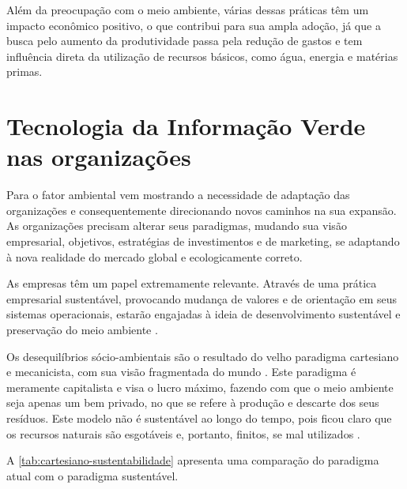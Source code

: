 Além da preocupação com o meio ambiente, várias dessas práticas têm um impacto econômico positivo, o que contribui para sua ampla adoção, já que a busca pelo aumento da produtividade passa pela redução de gastos e tem influência direta da utilização de recursos básicos, como água, energia e matérias primas.

\section{Tecnologia da Informação Verde nas organizações}

Para  o fator ambiental vem mostrando a necessidade de adaptação das organizações e consequentemente direcionando novos caminhos na sua expansão. As organizações precisam alterar seus paradigmas, mudando sua visão empresarial, objetivos, estratégias de investimentos e de marketing, se adaptando à nova realidade do mercado global e ecologicamente correto.

\begin{citacao}
As empresas têm um papel extremamente relevante. Através de uma prática empresarial sustentável, provocando mudança de valores e de orientação em seus sistemas operacionais, estarão engajadas à ideia de desenvolvimento sustentável e preservação do meio ambiente \cite[p. 3]{kraemer2005responsabilidade}. 
\end{citacao}

Os desequilíbrios sócio-ambientais são o resultado do velho paradigma cartesiano e mecanicista, com sua visão fragmentada do mundo \cite[p. 28]{almeida2002bom}. Este paradigma é meramente capitalista e visa o lucro máximo, fazendo com que o meio ambiente seja apenas um bem privado, no que se refere à produção e descarte dos seus resíduos. Este modelo não é sustentável ao longo do tempo, pois ficou claro que os recursos naturais são esgotáveis e, portanto, finitos, se mal utilizados \cite{kraemer2005responsabilidade}.

A \autoref{tab:cartesiano-sustentabilidade} apresenta uma comparação do paradigma atual com o paradigma sustentável.

